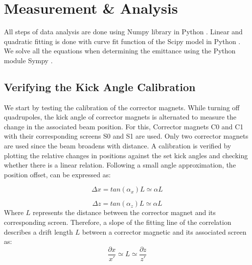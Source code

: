 \documentclass[12pt]{article}
\begin{document}
\section{Measurement \& Analysis}
All steps of data analysis are done using Numpy library in Python \cite{numpy}. Linear and quadratic fitting is done with curve fit function of the Scipy model in Python \cite{scipy}. We solve all the equations when determining the emittance using the Python module Sympy \cite{sympy}.
\subsection{Verifying the Kick Angle Calibration}

We start by testing the calibration of the corrector magnets. While turning off quadrupoles, the kick angle of corrector magnets is alternated to measure the change in the associated beam position. For this, Corrector magnets C0 and C1 with their corresponding screens S0 and S1 are used. Only two corrector magnets are used since the beam broadens with distance. A calibration is verified by plotting the relative changes in positions against the set kick angles and checking whether there is a linear relation. Following a small angle approximation, the position offset, can be expressed as:

\begin{equation}
    \Delta x = tan (\alpha_x) L \simeq \alpha L 
    \label{eq5}
\end{equation}

\begin{equation}
    \Delta z = tan (\alpha_z) L \simeq \alpha L
    \label{eq6}
\end{equation}
Where $L$ represents the distance between the corrector magnet and its corresponding screen. Therefore, a slope of the fitting line of the correlation describes a drift length $L$ between a corrector magnetic and its associated screen as:
\begin{equation*}
    \frac{\partial x}{x'} \simeq L \simeq \frac{\partial z}{z'}
\end{equation*}
\end{document}
